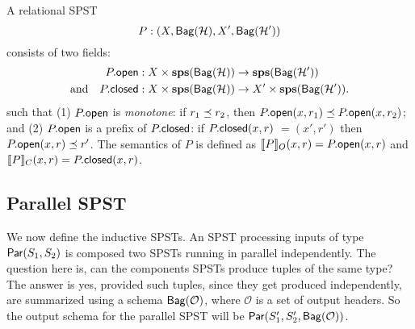 \begin{definition}
A relational SPST
\[P : (X, \relleaf{\mathcal{H}}, X', \relleaf{\mathcal{H}'})\]
consists of two fields:
\begin{align*}
\spstfield{P}{open} &: X \times \sps(\relleaf{\mathcal{H}}) \to \sps(\relleaf{\mathcal{H}'}) \\
\text{and} \quad
\spstfield{P}{closed} &: X \times \sps(\relleaf{\mathcal{H}}) \to X' \times \sps(\relleaf{\mathcal{H}'}).
\end{align*}
such that
(1) $\spstfield{P}{open}$ is \emph{monotone}:
if $r_1 \prefix r_2$, then $\spstfield{P}{open}(x, r_1) \prefix \spstfield{P}{open}(x, r_2)$;
and
(2) $\spstfield{P}{open}$ is a prefix of $\spstfield{P}{closed}$:
if $\spstfield{P}{closed}(x, r)$ $= (x', r')$
then $\spstfield{P}{open}(x, r) \prefix r'$.
The semantics of $P$ is defined as
$\spstsemO{x}{r}{P} = \spstfield{P}{open}(x, r)$
and $\spstsemC{x}{r}{P} = \spstfield{P}{closed}(x, r)$.

\end{definition}

\subsection{Parallel SPST}

We now define the inductive SPSTs.
An SPST processing inputs of type
$\parcomp{S_1}{S_2}$ is composed two SPSTs running in parallel independently.
The question here is, can the components SPSTs produce tuples of the same type?
The answer is yes, provided such tuples, since they get produced independently,
are summarized using a schema $\relleaf{\mathcal{O}}$,
where $\mathcal{O}$ is a set of output headers.
So the output schema for the parallel SPST
will be $\parthree{S_1'}{S_2'}{\relleaf{\mathcal{O}}}$.


